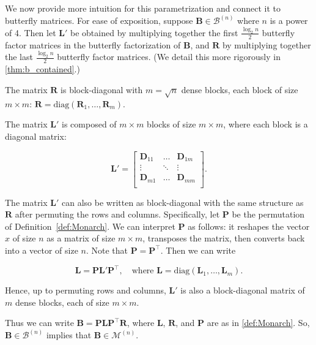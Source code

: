 We now provide more intuition for this parametrization and connect it to butterfly matrices. For ease of exposition, suppose $\mathbf{B} \in \mathcal{B}^{(n)}$ where $n$ is a power of 4. Then let $\mathbf{L}'$ be obtained by multiplying together the first $\tfrac{\log_2 n}{2}$ butterfly factor matrices in the butterfly factorization of $\mathbf{B}$,
and $\mathbf{R}$ by multiplying together the last $\tfrac{\log_2 n}{2}$ butterfly factor matrices. (We detail this more rigorously in \ref{thm:b_contained}.)

The matrix $\mathbf{R}$ is block-diagonal with $m = \sqrt{n}$ dense blocks, each block of size $m \times m$: $
  \mathbf{R} = \mathrm{diag}(\mathbf{R}_1, \dots, \mathbf{R}_{m}).
$

The matrix $\mathbf{L}'$ is composed of $m \times m$ blocks of size $m \times m$, where each block is a diagonal matrix:

\begin{equation*}
  \mathbf{L}' =
  \begin{bmatrix}
    \mathbf{D}_{11} & \hdots & \mathbf{D}_{1m} \\
    \vdots & \ddots & \vdots \\
    \mathbf{D}_{m1} & \hdots & \mathbf{D}_{mm} \\
  \end{bmatrix}.
\end{equation*}

The matrix $\mathbf{L}'$ can also be written as block-diagonal with the same structure as $\mathbf{R}$
after permuting the rows and columns. Specifically, let $\mathbf{P}$ be the permutation of Definition~\ref{def:Monarch}.
We can interpret $\mathbf{P}$ as follows: it reshapes the vector $x$ of size $n$ as a matrix of size $m \times m$, transposes the matrix, then converts back into a vector of size $n$. Note that $\mathbf{P} = \mathbf{P}^\top$.
Then we can write

\begin{equation*}
  \mathbf{L} = \mathbf{P} \mathbf{L}' \mathbf{P}^\top, \quad \text{where } \mathbf{L} = \mathrm{diag}(\mathbf{L}_1, \dots, \mathbf{L}_{m}).
\end{equation*}

Hence, up to permuting rows and columns, $\mathbf{L}'$ is also a block-diagonal matrix of $m$ dense blocks, each of size $m \times m$.

Thus we can write $\mathbf{B} = \mathbf{P} \mathbf{L} \mathbf{P}^\top \mathbf{R}$,
where $\mathbf{L}$, $\mathbf{R}$, and $\mathbf{P}$ are as in \ref{def:Monarch}.
So, $\mathbf{B} \in \mathcal{B}^{(n)}$ implies that $\mathbf{B} \in \mathcal{M}^{(n)}$.

